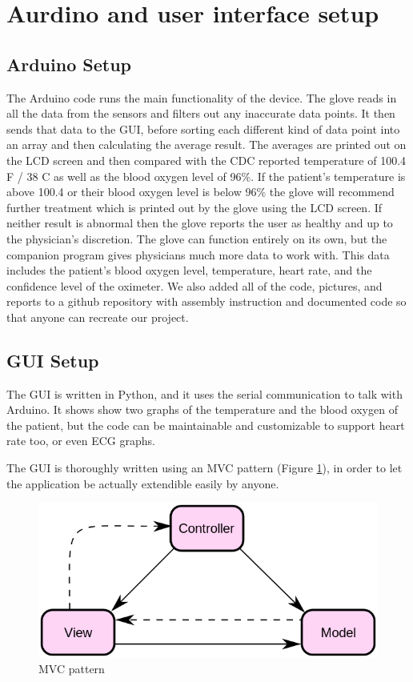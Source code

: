 \section{Aurdino and user interface setup}
\subsection{Arduino Setup}
The Arduino code runs the main functionality of the device. The glove reads in all the data from the sensors and filters out any inaccurate data points. It then sends that data to the GUI, before sorting each different kind of data point into an array and then calculating the average result. The averages are printed out on the LCD screen and then compared with the CDC reported temperature of 100.4 F / 38 C as well as the blood oxygen level of 96\%. If the patient’s temperature is above 100.4 or their blood oxygen level is below 96\% the glove will recommend further treatment which is printed out by the glove using the LCD screen. If neither result is abnormal then the glove reports the user as healthy and up to the physician’s discretion. The glove can function entirely on its own, but the companion program gives physicians much more data to work with. This data includes the patient’s blood oxygen level, temperature, heart rate, and the confidence level of the oximeter. We also added all of the code, pictures, and reports to a github repository with assembly instruction and documented code so that anyone can recreate our project.

\subsection{GUI Setup}
The GUI is written in Python, and it uses the serial communication to talk with Arduino. It shows show two graphs of the temperature and the blood oxygen of the patient, but the code can be maintainable and customizable to support heart rate too, or even ECG graphs.

The GUI is thoroughly written using an MVC pattern (Figure \ref{fig:MVC}), in order to let the application be actually extendible easily by anyone.

\begin{figure}[t]
    \centering
    \includegraphics[width=\linewidth]{resources/MVC.png}
    \caption{MVC pattern}
    \label{fig:MVC}
\end{figure}

